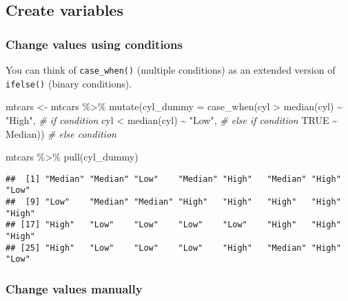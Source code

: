 \documentclass[
]{book}
\newenvironment{Shaded}{\begin{snugshade}}{\end{snugshade}}
\newcommand{\AttributeTok}[1]{\textcolor[rgb]{0.77,0.63,0.00}{#1}}
\newcommand{\CommentTok}[1]{\textcolor[rgb]{0.56,0.35,0.01}{\textit{#1}}}
\newcommand{\ConstantTok}[1]{\textcolor[rgb]{0.00,0.00,0.00}{#1}}
\newcommand{\FunctionTok}[1]{\textcolor[rgb]{0.00,0.00,0.00}{#1}}
\newcommand{\NormalTok}[1]{#1}
\newcommand{\OtherTok}[1]{\textcolor[rgb]{0.56,0.35,0.01}{#1}}
\newcommand{\SpecialCharTok}[1]{\textcolor[rgb]{0.00,0.00,0.00}{#1}}
\newcommand{\StringTok}[1]{\textcolor[rgb]{0.31,0.60,0.02}{#1}}
\begin{document}
\hypertarget{create-variables}{%
\subsection{Create variables}\label{create-variables}}

\hypertarget{change-values-using-conditions}{%
\subsubsection{Change values using conditions}\label{change-values-using-conditions}}

You can think of \texttt{case\_when()} (multiple conditions) as an extended version of \texttt{ifelse()} (binary conditions).

\begin{Shaded}
\begin{Highlighting}[]
\NormalTok{mtcars }\OtherTok{\textless{}{-}}\NormalTok{ mtcars }\SpecialCharTok{\%\textgreater{}\%}
  \FunctionTok{mutate}\NormalTok{(}\AttributeTok{cyl\_dummy =} \FunctionTok{case\_when}\NormalTok{(cyl }\SpecialCharTok{\textgreater{}} \FunctionTok{median}\NormalTok{(cyl) }\SpecialCharTok{\textasciitilde{}} \StringTok{"High"}\NormalTok{, }\CommentTok{\# if condition}
\NormalTok{                               cyl }\SpecialCharTok{\textless{}} \FunctionTok{median}\NormalTok{(cyl) }\SpecialCharTok{\textasciitilde{}} \StringTok{"Low"}\NormalTok{, }\CommentTok{\# else if condition }
                               \ConstantTok{TRUE} \SpecialCharTok{\textasciitilde{}} \StringTok{\textquotesingle{}Median\textquotesingle{}}\NormalTok{)) }\CommentTok{\# else condition }

\NormalTok{mtcars }\SpecialCharTok{\%\textgreater{}\%} \FunctionTok{pull}\NormalTok{(cyl\_dummy)}
\end{Highlighting}
\end{Shaded}

\begin{verbatim}
##  [1] "Median" "Median" "Low"    "Median" "High"   "Median" "High"   "Low"   
##  [9] "Low"    "Median" "Median" "High"   "High"   "High"   "High"   "High"  
## [17] "High"   "Low"    "Low"    "Low"    "Low"    "High"   "High"   "High"  
## [25] "High"   "Low"    "Low"    "Low"    "High"   "Median" "High"   "Low"
\end{verbatim}

\hypertarget{change-values-manually}{%
\subsubsection{Change values manually}\label{change-values-manually}}
\end{document}
